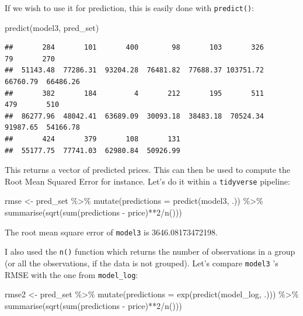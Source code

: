 \documentclass[
]{article}
\newenvironment{Shaded}{\begin{snugshade}}{\end{snugshade}}
\newcommand{\AttributeTok}[1]{\textcolor[rgb]{0.77,0.63,0.00}{#1}}
\newcommand{\DecValTok}[1]{\textcolor[rgb]{0.00,0.00,0.81}{#1}}
\newcommand{\FunctionTok}[1]{\textcolor[rgb]{0.00,0.00,0.00}{#1}}
\newcommand{\NormalTok}[1]{#1}
\newcommand{\OtherTok}[1]{\textcolor[rgb]{0.56,0.35,0.01}{#1}}
\newcommand{\SpecialCharTok}[1]{\textcolor[rgb]{0.00,0.00,0.00}{#1}}
\begin{document}
If we wish to use it for prediction, this is easily done with \texttt{predict()}:

\begin{Shaded}
\begin{Highlighting}[]
\FunctionTok{predict}\NormalTok{(model3, pred\_set)}
\end{Highlighting}
\end{Shaded}

\begin{verbatim}
##       284       101       400        98       103       326        79       270 
##  51143.48  77286.31  93204.28  76481.82  77688.37 103751.72  66760.79  66486.26 
##       382       184         4       212       195       511       479       510 
##  86277.96  48042.41  63689.09  30093.18  38483.18  70524.34  91987.65  54166.78 
##       424       379       108       131 
##  55177.75  77741.03  62980.84  50926.99
\end{verbatim}

This returns a vector of predicted prices. This can then be used to compute the Root Mean Squared Error
for instance. Let's do it within a \texttt{tidyverse} pipeline:

\begin{Shaded}
\begin{Highlighting}[]
\NormalTok{rmse }\OtherTok{\textless{}{-}}\NormalTok{ pred\_set }\SpecialCharTok{\%\textgreater{}\%}
  \FunctionTok{mutate}\NormalTok{(}\AttributeTok{predictions =} \FunctionTok{predict}\NormalTok{(model3, .)) }\SpecialCharTok{\%\textgreater{}\%}
  \FunctionTok{summarise}\NormalTok{(}\FunctionTok{sqrt}\NormalTok{(}\FunctionTok{sum}\NormalTok{(predictions }\SpecialCharTok{{-}}\NormalTok{ price)}\SpecialCharTok{**}\DecValTok{2}\SpecialCharTok{/}\FunctionTok{n}\NormalTok{()))}
\end{Highlighting}
\end{Shaded}

The root mean square error of \texttt{model3} is 3646.08173472198.

I also used the \texttt{n()} function which returns the number of observations in a group (or all the
observations, if the data is not grouped). Let's compare \texttt{model3} 's RMSE with the one from
\texttt{model\_log}:

\begin{Shaded}
\begin{Highlighting}[]
\NormalTok{rmse2 }\OtherTok{\textless{}{-}}\NormalTok{ pred\_set }\SpecialCharTok{\%\textgreater{}\%}
  \FunctionTok{mutate}\NormalTok{(}\AttributeTok{predictions =} \FunctionTok{exp}\NormalTok{(}\FunctionTok{predict}\NormalTok{(model\_log, .))) }\SpecialCharTok{\%\textgreater{}\%}
  \FunctionTok{summarise}\NormalTok{(}\FunctionTok{sqrt}\NormalTok{(}\FunctionTok{sum}\NormalTok{(predictions }\SpecialCharTok{{-}}\NormalTok{ price)}\SpecialCharTok{**}\DecValTok{2}\SpecialCharTok{/}\FunctionTok{n}\NormalTok{()))}
\end{Highlighting}
\end{Shaded}
\end{document}
